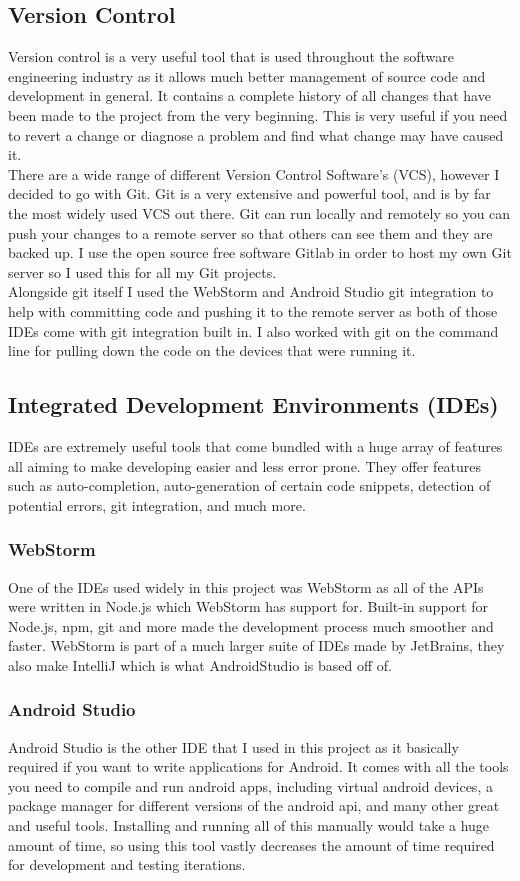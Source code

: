 \subsection{Version Control}
Version control is a very useful tool that is used throughout the software engineering industry as it allows much better management of source code and development in general. It contains a complete history of all changes that have been made to the project from the very beginning. This is very useful if you need to revert a change or diagnose a problem and find what change may have caused it.
\\
\indent There are a wide range of different Version Control Software's (VCS), however I decided to go with Git. Git is a very extensive and powerful tool, and is by far the most widely used VCS out there. Git can run locally and remotely so you can push your changes to a remote server so that others can see them and they are backed up. I use the open source free software Gitlab in order to host my own Git server so I used this for all my Git projects.
\\
\indent Alongside git itself I used the WebStorm and Android Studio git integration to help with committing code and pushing it to the remote server as both of those IDEs come with git integration built in. I also worked with git on the command line for pulling down the code on the devices that were running it.

\subsection{Integrated Development Environments (IDEs)}
IDEs are extremely useful tools that come bundled with a huge array of features all aiming to make developing easier and less error prone. They offer features such as auto-completion, auto-generation of certain code snippets, detection of potential errors, git integration, and much more.

\subsubsection*{WebStorm}
One of the IDEs used widely in this project was WebStorm as all of the APIs were written in Node.js which WebStorm has support for. Built-in support for Node.js, npm, git and more made the development process much smoother and faster. WebStorm is part of a much larger suite of IDEs made by JetBrains, they also make IntelliJ which is what AndroidStudio is based off of.

\subsubsection*{Android Studio}
Android Studio is the other IDE that I used in this project as it basically required if you want to write applications for Android. It comes with all the tools you need to compile and run android apps, including virtual android devices, a package manager for different versions of the android api, and many other great and useful tools. Installing and running all of this manually would take a huge amount of time, so using this tool vastly decreases the amount of time required for development and testing iterations.